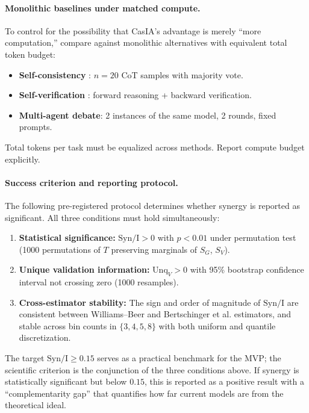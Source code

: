 \documentclass[11pt,a4paper]{article}
\theoremstyle{remark}
\newcommand{\Syn}{\mathrm{Syn}}
\newcommand{\Unq}{\mathrm{Unq}}
\newcommand{\MI}{\mathrm{I}}
\begin{document}
\paragraph{Monolithic baselines under matched compute.} To control for the possibility that CasIA's advantage is merely ``more computation,'' compare against monolithic alternatives with equivalent total token budget:
\begin{itemize}
  \item \textbf{Self-consistency} \cite{wang2023selfconsistency}: $n = 20$ CoT samples with majority vote.
  \item \textbf{Self-verification} \cite{weng2023verification}: forward reasoning + backward verification.
  \item \textbf{Multi-agent debate}: 2 instances of the same model, 2 rounds, fixed prompts.
\end{itemize}
Total tokens per task must be equalized across methods. Report compute budget explicitly.

\paragraph{Success criterion and reporting protocol.} The following pre-registered protocol determines whether synergy is reported as significant. All three conditions must hold simultaneously:
\begin{enumerate}
  \item \textbf{Statistical significance:} $\Syn / \MI > 0$ with $p < 0.01$ under permutation test (1000 permutations of $T$ preserving marginals of $S_G$, $S_V$).
  \item \textbf{Unique validation information:} $\Unq_V > 0$ with 95\% bootstrap confidence interval not crossing zero (1000 resamples).
  \item \textbf{Cross-estimator stability:} The sign and order of magnitude of $\Syn / \MI$ are consistent between Williams--Beer \cite{williams2010pid} and Bertschinger et al. \cite{bertschinger2014pid} estimators, and stable across bin counts in $\{3, 4, 5, 8\}$ with both uniform and quantile discretization.
\end{enumerate}
The target $\Syn / \MI \geq 0.15$ serves as a practical benchmark for the MVP; the scientific criterion is the conjunction of the three conditions above. If synergy is statistically significant but below $0.15$, this is reported as a positive result with a ``complementarity gap'' that quantifies how far current models are from the theoretical ideal.
\end{document}
